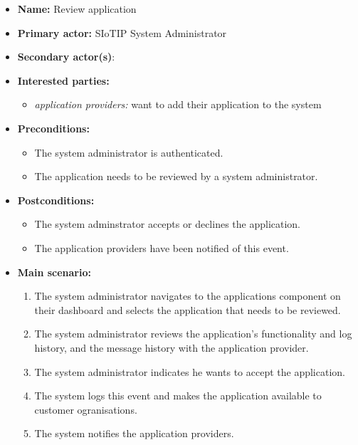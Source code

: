 \begin{itemize}
    \item \textbf{Name:} Review application
    \item \textbf{Primary actor:} SIoTIP System Administrator
    \item \textbf{Secondary actor(s)}:
    \item \textbf{Interested parties:}
        \begin{itemize}
            \item \textit{application providers:} want to add their application to the system
        \end{itemize}

    \item \textbf{Preconditions:}
        \begin{itemize}
            \item The system administrator is authenticated.
            \item The application needs to be reviewed by a system administrator.
        \end{itemize}

    \item \textbf{Postconditions:}
        \begin{itemize}
            \item The system adminstrator accepts or declines the application.
            \item The application providers have been notified of this event.
        \end{itemize}

    \item \textbf{Main scenario:}
        \begin{enumerate}
            \item The system administrator navigates to the applications component on their
                  dashboard and selects the application that needs to be reviewed.
            \item The system administrator reviews the application's functionality and
                  log history, and the message history with the application provider.
            \item The system administrator indicates he wants to accept the application.
            \item The system logs this event and makes the application available to
                  customer ogranisations.
            \item The system notifies the application providers.
        \end{enumerate}


\end{itemize}
